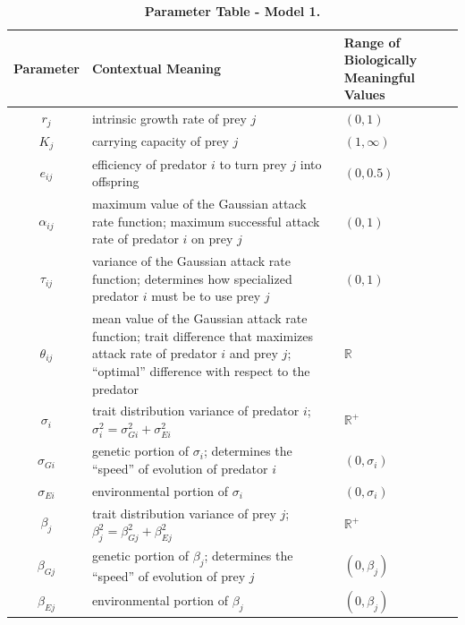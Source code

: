 \documentclass{amsart}
\theoremstyle{definition}
\theoremstyle{remark}
\numberwithin{equation}{section}
\begin{document}
\begin{table}[h]
	\label{parameter_table_model_1}
    \begin{tabular}{||c|L{7cm}|L{2.5cm}||}\hline\hline
    {\bf Parameter} & {\bf Contextual Meaning} & {\bf Range of Biologically Meaningful Values} \\\hline\hline
    $r_j$ & intrinsic growth rate of prey $j$ & $(0, 1)$ \\\hline
    $K_j$ & carrying capacity of prey $j$ & $(1, \infty)$ \\\hline\hline
    $e_{ij}$ & efficiency of predator $i$ to turn prey $j$ into offspring & $(0, 0.5)$ \\\hline\hline
    $\alpha_{ij}$ & maximum value of the Gaussian attack rate function; maximum successful attack rate of predator $i$ on prey $j$ & $(0, 1)$ \\\hline
    $\tau_{ij}$   & variance of the Gaussian attack rate function; determines how specialized predator $i$ must be to use prey $j$ & $(0, 1)$ \\\hline
    $\theta_{ij}$ & mean value of the Gaussian attack rate function; trait difference that maximizes attack rate of predator $i$ and prey $j$; ``optimal'' difference with respect to the predator & $\mathbb{R}$ \\\hline\hline
    $\sigma_i$ & trait distribution variance of predator $i$; $\sigma_i^2 = \sigma_{Gi}^2 + \sigma_{Ei}^2$ & $\mathbb{R}^{+}$ \\\hline
    $\sigma_{Gi}$ & genetic portion of $\sigma_i$; determines the ``speed'' of evolution of predator $i$ & $(0, \sigma_i)$ \\\hline
    $\sigma_{Ei}$ & environmental portion of $\sigma_i$ & $(0, \sigma_i)$ \\\hline\hline
    $\beta_j$ & trait distribution variance of prey $j$; $\beta_j^2 = \beta_{Gj}^2 + \beta_{Ej}^2$ & $\mathbb{R}^{+}$ \\\hline
    $\beta_{Gj}$ & genetic portion of $\beta_j$; determines the ``speed'' of evolution of prey $j$ & $(0, \beta_j)$ \\\hline
    $\beta_{Ej}$ & environmental portion of $\beta_j$ & $(0, \beta_j)$ \\\hline\hline
    \end{tabular}
    \caption{\footnotesize{\bf Parameter Table - Model 1.}}
\end{table}
\end{document}
